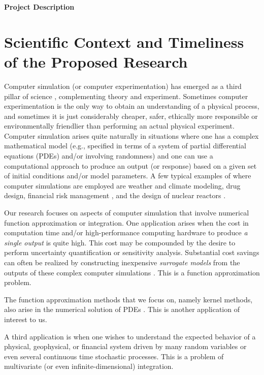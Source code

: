 \documentclass[11pt]{NSFamsart}
\begin{document}

\centerline{\Large \bf Project Description}
\section{Scientific Context and Timeliness of the Proposed Research}
Computer simulation (or computer experimentation) has emerged as a third pillar of science \citep{PITAC05,OdenGhattas14}, complementing theory and experiment. Sometimes computer experimentation is the only way to obtain an understanding of a physical process, and sometimes it is just considerably cheaper, safer, ethically more responsible or environmentally friendlier than performing an actual physical experiment.  Computer simulation arises quite naturally in situations where one has a complex mathematical model (e.g., specified in terms of a system of partial differential equations (PDEs) and/or involving randomness) and one can use a computational approach to produce an output (or response) based on a given set of initial conditions and/or model parameters. A few typical examples of where computer simulations are employed are weather and climate modeling, drug design, financial risk management \citep{Gla03}, and the design of nuclear reactors \citep[Sect.\ 2.4]{Smi14a}.

Our research focuses on aspects of computer simulation that involve numerical function approximation or integration.  One application arises when the cost in computation time and/or high-performance computing hardware to produce \emph{a single output} is quite high.  This cost may be compounded by the desire to perform uncertainty quantification or sensitivity analysis. Substantial cost savings can often be realized by constructing inexpensive \emph{surrogate models} from the outputs of these complex computer simulations \citep{FangEtAl06,ForEtal09,SantnerWilliamsNotz03}.  This is a function approximation problem.

The function approximation methods that we focus on, namely kernel methods, also arise in the numerical solution of PDEs \citep{ChenEtAl14,FornbergFlyer15,SarraKansa09}.  This is another application of interest to us.

A third application is when one wishes to understand the expected behavior of a physical, geophysical, or financial system driven by many random variables or even several continuous time stochastic processes.  This is a problem of multivariate (or even infinite-dimensional) integration.
\end{document}
